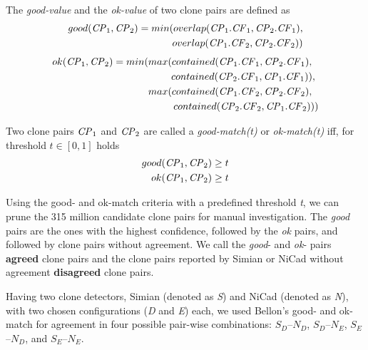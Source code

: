 \documentclass[sigconf,review, anonymous]{acmart}
\newcommand{\squeezeup}{\vspace{-0.5mm}}
\begin{document}
\noindent%
The \textit{good-value}  and the \textit{ok-value}  of two clone pairs are defined as
\begin{align*}
	good(\textrm{\textit{CP}}_1, \textrm{\textit{CP}}_2) = min(overlap(\textrm{\textit{CP}}_1.\textrm{\textit{CF}}_1,\textrm{\textit{CP}}_2.\textrm{\textit{CF}}_1), \\ overlap(\textrm{\textit{CP}}_1.\textrm{\textit{CF}}_2,\textrm{\textit{CP}}_2.\textrm{\textit{CF}}_2))
\end{align*}
\begin{align*}
	ok(\textrm{\textit{CP}}_1,\textrm{\textit{CP}}_2) = min(max(contained(\textrm{\textit{CP}}_1.\textrm{\textit{CF}}_1,\textrm{\textit{CP}}_2.\textrm{\textit{CF}}_1),~~ \\ contained(\textrm{\textit{CP}}_2.\textrm{\textit{CF}}_1,\textrm{\textit{CP}}_1.\textrm{\textit{CF}}_1)),~
	\\ max(contained(\textrm{\textit{CP}}_1.\textrm{\textit{CF}}_2,\textrm{\textit{CP}}_2.\textrm{\textit{CF}}_2),~~ \\contained(\textrm{\textit{CP}}_2.\textrm{\textit{CF}}_2,\textrm{\textit{CP}}_1.\textrm{\textit{CF}}_2)))
\end{align*}

\noindent%
Two clone pairs $\textrm{\textit{CP}}_1$ and $\textrm{\textit{CP}}_2$
are called a \textit{\textit{good-match}(t)} or \textit{ok-match(t)}  iff, for threshold $t \in [0,1]$ holds 
\begin{align*}
good(\textrm{\textit{CP}}_1,\textrm{\textit{CP}}_2) & \geq t\\
ok(\textrm{\textit{CP}}_1,\textrm{\textit{CP}}_2) & \geq t
\end{align*}

Using the good- and ok-match criteria with a predefined threshold
\textit{t}, we can prune the 315 million candidate clone pairs for
manual investigation. The \textit{good} pairs are the ones with the
highest confidence, followed by the \textit{ok} pairs, and followed by
clone pairs without agreement. We call the \textit{good}- and
\textit{ok}- pairs \textbf{agreed} clone pairs and the clone pairs
reported by Simian or NiCad without agreement \textbf{disagreed} clone
pairs.

Having two clone detectors, Simian (denoted as \textit{S}) and NiCad
(denoted as \textit{N}), with two chosen configurations (\textit{D}
and \textit{E}) each, we used Bellon's good- and ok-match for agreement
in four possible pair-wise combinations: $S_{D}$--$N_{D}$,
$S_{D}$--$N_{E}$, $S_{E}$--$N_{D}$, and $S_{E}$--$N_{E}$. %
\end{document}
